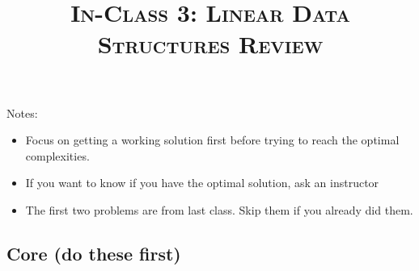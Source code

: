 \documentclass{article}
\title{\large{\textsc{In-Class 3: Linear Data Structures Review}}}
\date{}
\begin{document}
\maketitle
        
\subsection*{}

Notes:

\begin{itemize}
  \item Focus on getting a working solution first before trying to reach the optimal complexities.
  \item If you want to know if you have the optimal solution, ask an instructor
  \item The first two problems are from last class. Skip them if you already did them.
\end{itemize}
    
\subsection*{Core (do these first)}
\end{document}

